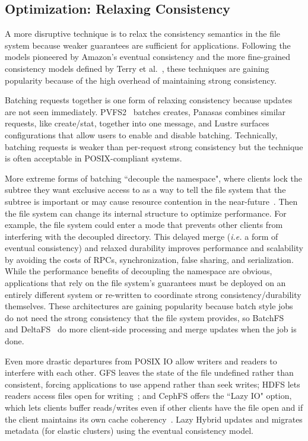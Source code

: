 \subsection{Optimization: Relaxing Consistency}

A more disruptive technique is to relax the consistency semantics in the file
system because weaker guarantees are sufficient for applications. Following the
models pioneered by Amazon's eventual consistency and the more fine-grained
consistency models defined by Terry et al.~\cite{baseball}, these techniques
are gaining popularity because of the high overhead of maintaining strong
consistency.

Batching requests together is one form of relaxing consistency because updates
are not seen immediately. PVFS2~\cite{PVFS2} batches creates, Panasas combines
similar requests, like create/stat, together into one message, and Lustre
surfaces configurations that allow users to enable and disable batching.
Technically, batching requests is weaker than per-request strong consistency
but the technique is often acceptable in POSIX-compliant systems.

More extreme forms of batching ``decouple the namespace", where clients lock
the subtree they want exclusive access to as a way to tell the file system that
the subtree is important or may cause resource contention in the
near-future~\cite{grider:pdsw2015-marfs, zheng:pdsw2015-deltafs,
zheng:pdsw2014-batchfs, ren:sc2014-indexfs, bent:slides-twotiers}. Then the
file system can change its internal structure to optimize performance. For
example, the file system could enter a mode that prevents other clients from
interfering with the decoupled directory.  This delayed merge ({\it i.e.} a
form of eventual consistency) and relaxed durability improves performance and
scalability by avoiding the costs of RPCs, synchronization, false sharing, and
serialization.  While the performance benefits of decoupling the namespace are
obvious, applications that rely on the file system's guarantees must be
deployed on an entirely different system or re-written to coordinate strong
consistency/durability themselves.  These architectures are gaining popularity
because batch style jobs do not need the strong consistency that the file
system provides, so BatchFS~\cite{zheng:pdsw2014-batchfs} and
DeltaFS~\cite{zheng:pdsw2015-deltafs} do more client-side processing and merge
updates when the job is done.  

Even more drastic departures from POSIX IO allow writers and readers to
interfere with each other. GFS leaves the state of the file undefined rather
than consistent, forcing applications to use append rather than seek writes;
HDFS lets readers access files open for
writing~\cite{hakimzadeh:dais14-hdfs-consistency}; and CephFS offers the ``Lazy
IO" option, which lets clients buffer reads/writes even if other clients have
the file open and if the client maintains its own cache
coherency~\cite{docs:cephcaps}.  Lazy Hybrid updates and migrates metadata (for
elastic clusters) using the eventual consistency model.

